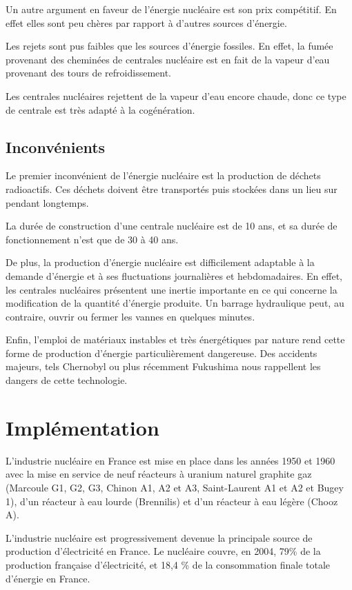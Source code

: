 \documentclass[12pt,a4paper,oneside,openany]{memoir}
\begin{document}
Un autre argument en faveur de l'énergie nucléaire est son prix compétitif. En effet elles sont peu chères par rapport à d'autres sources d'énergie.

Les rejets sont pus faibles que les sources d'énergie fossiles. En effet, la fumée provenant des cheminées de centrales nucléaire est en fait de la vapeur d'eau provenant des tours de refroidissement. 

Les centrales nucléaires rejettent de la vapeur d'eau encore chaude, donc ce type de centrale est très adapté à la cogénération.


\subsection{Inconvénients}
Le premier inconvénient de l'énergie nucléaire est la production de déchets radioactifs. Ces déchets doivent être transportés puis stockées dans un lieu sur pendant longtemps.

La durée de construction d'une centrale nucléaire est de 10 ans, et sa durée de fonctionnement n'est que de 30 à 40 ans.

De plus, la production d'énergie nucléaire est difficilement adaptable à la demande d'énergie et à ses fluctuations journalières et hebdomadaires. En effet, les centrales nucléaires présentent une inertie importante en ce qui concerne la modification de la quantité d'énergie produite. Un barrage hydraulique peut, au contraire, ouvrir ou fermer les vannes en quelques minutes.

Enfin, l'emploi de matériaux instables et très énergétiques par nature rend cette forme de production d'énergie particulièrement dangereuse. Des accidents majeurs, tels Chernobyl ou plus récemment Fukushima nous rappellent les dangers de cette technologie.

\section{Implémentation}

L’industrie nucléaire en France est mise en place dans les années 1950 et 1960 avec la mise en service de neuf réacteurs à uranium naturel graphite gaz (Marcoule G1, G2, G3, Chinon A1, A2 et A3, Saint-Laurent A1 et A2 et Bugey 1), d'un réacteur à eau lourde (Brennilis) et d'un réacteur à eau légère (Chooz A).

L'industrie nucléaire est progressivement devenue la principale source de production d'électricité en France. Le nucléaire couvre, en 2004, 79\% de la production française d'électricité, et 18,4 \% de la consommation finale totale d'énergie en France.
\end{document}
